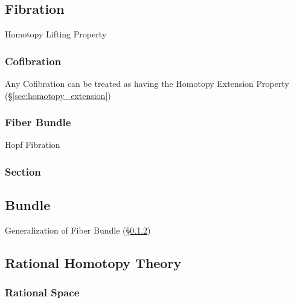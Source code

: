 \subsection{Fibration}\label{sec:fibration}

Homotopy Lifting Property



\subsubsection{Cofibration}\label{sec:cofibration}

Any Cofibration can be treated as having the Homotopy Extension
Property (\S\ref{sec:homotopy_extension})



\subsubsection{Fiber Bundle}\label{sec:fiber_bundle}

Hopf Fibration



\subsubsection{Section}\label{sec:section}



\subsection{Bundle}\label{sec:bundle}

Generalization of Fiber Bundle (\S\ref{sec:fiber_bundle})



\subsection{Rational Homotopy Theory}\label{sec:rational_homotopy}

\subsubsection{Rational Space}\label{sec:rational_space}


